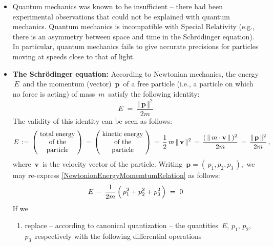 \begin{itemize}
\item
	Quantum mechanics was known to be insufficient -- there had been experimental observations
	that could not be explained with quantum mechanics.
	Quantum mechanics is incompatible with Special Relativity (e.g., there is an asymmetry between space and time
	in the Schr\"odinger equation).
	In particular, quantum mechanics fails to give accurate precisions for particles moving at speeds close to
	that of light.
\item
	\textbf{The Schr\"odinger equation:}
	\vskip 0.01cm
	According to Newtonian mechanics, the energy \,$E$\, and the momentum (vector) \,$\mathbf{p}$\,
	of a free particle (i.e., a particle on which no force is acting) of mass \,$m$\,
	satisfy the following identity:
	\begin{equation}
	\label{NewtonionEnergyMomemtumRelation}
	E \;=\; \dfrac{\Vert\,\mathbf{p}\,\Vert^{2}}{2m}
	\end{equation}
	The validity of this identity can be seen as follows:
	\begin{equation*}
	E
	\,:=\,
		\left(\!\begin{array}{c} \textnormal{total energy} \\ \textnormal{of the} \\ \textnormal{particle} \end{array}\!\right)
	\,=\,
		\left(\!\begin{array}{c} \textnormal{kinetic energy} \\ \textnormal{of the} \\ \textnormal{particle} \end{array}\!\right)
	\,=\,
		\dfrac{1}{2}\,m\,\Vert\,\mathbf{v}\,\Vert^{2}
	\,=\,
		\dfrac{(\,\Vert\,m\cdot\mathbf{v}\,\Vert\,)^{2}}{2m}
	\,=\,
		\dfrac{\Vert\,\mathbf{p}\,\Vert^{2}}{2m}\,,
	\end{equation*}
	where \,$\mathbf{v}$\, is the velocity vector of the particle.
	Writing
	\,$\mathbf{p} = (\,p_{1},p_{2},p_{3}\,)$,\,
	we may re-express
	\eqref{NewtonionEnergyMomemtumRelation}
	as follows:
	\begin{equation*}
	E \,-\, \dfrac{1}{2m}\left(\,p_{1}^{2} \overset{{\color{white}.}}{+} p_{2}^{2} + p_{3}^{2}\,\right) \;=\; 0
	\end{equation*}
	If we
	\begin{enumerate}
	\item
		replace -- according to canonical quantization -- the quantities
		\,$E$, $p_{1}$, $p_{2}$, $p_{3}$\,
		respectively with the following differential operations

\end{enumerate}
\end{itemize}
